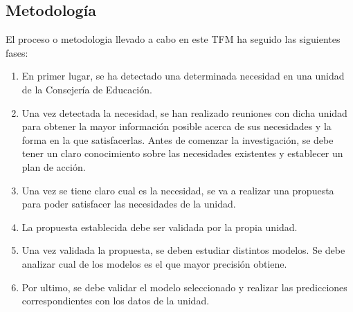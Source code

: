 \subsection{Metodología}
El proceso o metodologia llevado a cabo en este TFM ha seguido las siguientes fases:
\begin{enumerate}
	\item En primer lugar, se ha detectado una determinada necesidad en una unidad de la Consejería de Educación.
	\item Una vez detectada la necesidad, se han realizado reuniones con dicha unidad para obtener la mayor información posible acerca de sus necesidades y la forma en la que satisfacerlas. Antes de comenzar la investigación, se debe tener un claro conocimiento sobre las necesidades existentes y establecer un plan de acción.
	\item Una vez se tiene claro cual es la necesidad, se va a realizar una propuesta para poder satisfacer las necesidades de la unidad.
	\item La propuesta establecida debe ser validada por la propia unidad.
	\item Una vez validada la propuesta, se deben estudiar distintos modelos. Se debe analizar cual de los modelos es el que mayor precisión obtiene.
	\item Por ultimo, se debe validar el modelo seleccionado y realizar las predicciones correspondientes con los datos de la unidad.
\end{enumerate}



